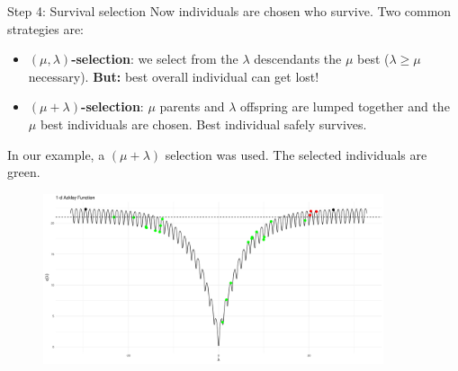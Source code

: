   \begin{frame}[allowframebreaks]{Step 4: Survival selection}
  Now individuals are chosen who survive. Two common strategies are:
  \begin{itemize}
  \item \textbf{$(\mu, \lambda)$-selection}: we select from the $\lambda$ descendants the $\mu$ best ($\lambda \ge \mu$ necessary).
  \textbf{But:} best overall individual can get lost!
  \item \textbf{$(\mu + \lambda)$-selection}: $\mu$ parents and $\lambda$ offspring are lumped together and the $\mu$ best individuals are chosen.
  Best individual safely survives.
  \end{itemize}

  \framebreak

  In our example, a $(\mu + \lambda)$ selection was used. The selected individuals are green.

  \begin{center}
    \begin{figure}
      \includegraphics[width=\textwidth, height=5cm]{images/ea_ex5.png}
    \end{figure}
  \end{center}

\end{frame}

